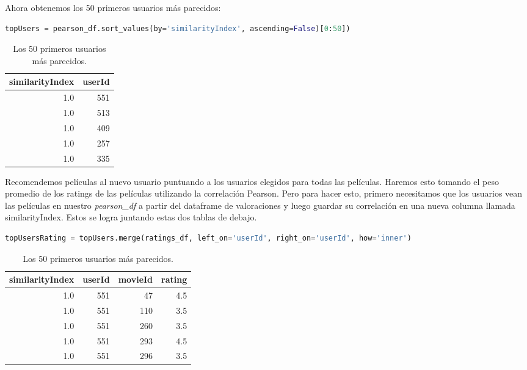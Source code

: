 \documentclass{uimppracticas}
\begin{document}
Ahora obtenemos los 50 primeros usuarios más parecidos:

\begin{lstlisting}[language=python]
topUsers = pearson_df.sort_values(by='similarityIndex', ascending=False)[0:50])
\end{lstlisting}

\begin{table}[h]
	\centering
	\begin{tabular}{rr}
		\toprule
		similarityIndex &  userId \\
		\midrule
		1.0 &     551 \\
		1.0 &     513 \\
		1.0 &     409 \\
		1.0 &     257 \\
		1.0 &     335 \\
		\bottomrule
	\end{tabular}
	\caption{Los 50 primeros usuarios más parecidos.}
	\label{usuarios_parecidos}
\end{table}

Recomendemos películas al nuevo usuario puntuando a los usuarios elegidos para todas las películas. Haremos esto tomando el peso promedio de los ratings de las películas utilizando la correlación Pearson. Pero para hacer esto, primero necesitamos que los usuarios vean las películas en nuestro \textit{pearson\_df} a partir del dataframe de valoraciones y luego guardar su correlación en una nueva columna llamada similarityIndex. Estos se logra juntando estas dos tablas de debajo.

\begin{lstlisting}[language=python]
topUsersRating = topUsers.merge(ratings_df, left_on='userId', right_on='userId', how='inner')
\end{lstlisting}

\begin{table}[h]
	\centering
	\begin{tabular}{rrrr}
		\toprule
		similarityIndex &  userId &  movieId &  rating \\
		\midrule
		1.0 &     551 &       47 &     4.5 \\
		1.0 &     551 &      110 &     3.5 \\
		1.0 &     551 &      260 &     3.5 \\
		1.0 &     551 &      293 &     4.5 \\
		1.0 &     551 &      296 &     3.5 \\
		\bottomrule
	\end{tabular}
	\caption{Los 50 primeros usuarios más parecidos.}
	\label{usuarios_parecidos}
\end{table}
\end{document}
